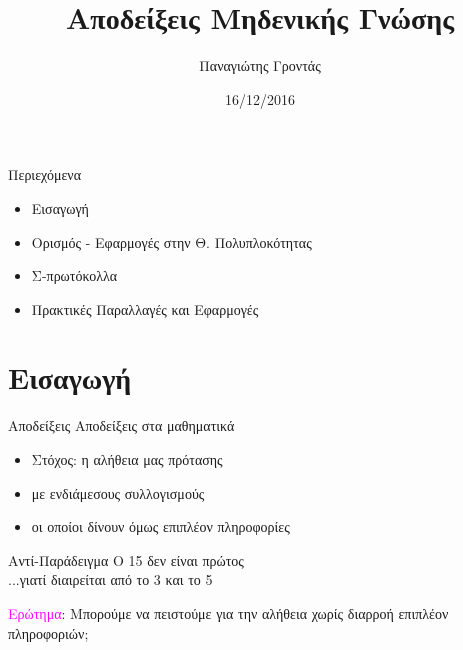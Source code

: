 \documentclass[handout]{beamer}
\title{Αποδείξεις Μηδενικής Γνώσης}
\author{Παναγιώτης Γροντάς}
\date{16/12/2016}
\institute{ΕΜΠ - Κρυπτογραφία (2016-2017)}
\begin{document}
\newcommand{\xor}{ \oplus }
\newcommand{\msg}{ \mathtt{M} }
\newcommand{\KEY}{ \mathtt{K} }
\newcommand{\prv}{$\mathcal{P}$ }
\newcommand{\ver}{$\mathcal{V}$ }
\newcommand{\siml}{$\mathcal{S}$ }
\newcommand{\CPH}{ \mathtt{C} }
\newcommand{\keygen}{\mathtt{KeyGen}}
\newcommand{\enc}{\mathtt{Encrypt}}
\newcommand{\dec}{\mathtt{Decrypt}}
\newcommand{\sign}{\mathtt{Sign}}
\newcommand{\verify}{\mathtt{Verify}}
\newcommand{\adv}{$\mathcal{A}$}
\newcommand{\Hash}{\mathcal{H}}
\newcommand{\advb}{$\mathcal{B}$}
\newcommand{\chal}{$\mathcal{C}$}
\newcommand{\cs}{$\mathcal{CS}$}
\newcommand{\Zed}{\mathbb{Z}} 
\newcommand{\zns}{\mathbb{Z}^*_n}
\newcommand{\zs}[1]{\mathbb{Z}^*_{#1}}

\newcommand{\green}[1]{\textcolor{teal}{#1}}
\newcommand{\Green}[1]{\textcolor{Teal}{#1}}
\newcommand{\ForestGreen}[1]{\textcolor{ForestGreen}{#1}}
\newcommand{\blue}[1]{\textcolor{blue}{#1}}
\newcommand{\magenta}[1]{\textcolor{magenta}{#1}}
\newcommand{\cyan}[1]{\textcolor{cyan}{#1}}

\newcommand{\twopartdef}[4]
{ 
		\begin{cases}
			#1 , #2 \\
			#3 , #4
		\end{cases} 
}
\begin{frame}
\titlepage
\end{frame}

\begin{frame}{Περιεχόμενα}
\begin{itemize}
\item Εισαγωγή
\pause
\item Ορισμός - Εφαρμογές στην Θ. Πολυπλοκότητας
\pause
\item Σ-πρωτόκολλα
\pause
\item Πρακτικές Παραλλαγές και Εφαρμογές
\end{itemize}
\end{frame}

\section{Εισαγωγή}
\begin{frame}{Αποδείξεις}
Αποδείξεις στα μαθηματικά
\pause
\begin{itemize}
\item Στόχος: η αλήθεια μας πρότασης
\pause
\item με ενδιάμεσους συλλογισμούς
\pause
\item οι οποίοι δίνουν όμως επιπλέον πληροφορίες
\pause
\end{itemize}
\begin{block}{\alert{Αντί-Παράδειγμα}}
O 15 δεν είναι πρώτος \\
\pause
...γιατί διαιρείται από το 3 και το 5
\end{block}
\pause
\magenta{Ερώτημα}: Μπορούμε να πειστούμε για την αλήθεια χωρίς διαρροή επιπλέον πληροφοριών;
\end{frame}
\end{document}
